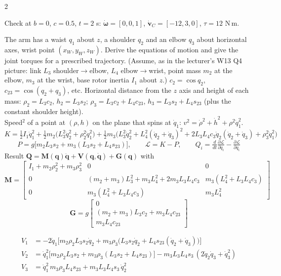 \begin{multicols}{2}
\begin{examq}
Check at $b=0$, $c=0.5$, $t=2$ s: $\dot{\boldsymbol\omega}=[0,0,1]$, $\dot{\mathbf v}_C=[-12,3,0]$, $\tau=12$ N\,m. \chk
\end{examq}
\begin{examq}
The arm has a waist $q_1$ about $z$, a shoulder $q_2$ and an elbow $q_3$ about horizontal axes, wrist point $(x_W,y_W,z_W)$. Derive the equations of motion and give the joint torques for a prescribed trajectory. (Assume, as in the lecturer's W13 Q4 picture: link $L_3$ shoulder$\to$elbow, $L_4$ elbow$\to$wrist, point mass $m_2$ at the elbow, $m_3$ at the wrist, base rotor inertia $I_1$ about $z$.)
\solution
$c_2=\cos q_2$, $c_{23}=\cos(q_2+q_3)$, etc. Horizontal distance from the $z$ axis and height of each mass:
$\rho_2=L_3c_2$, $h_2=L_3s_2$; $\rho_3=L_3c_2+L_4c_{23}$, $h_3=L_3s_2+L_4s_{23}$ (plus the constant shoulder height).\\
Speed$^2$ of a point at $(\rho,h)$ on the plane that spins at $\dot q_1$: $v^2=\dot\rho^2+\dot h^2+\rho^2\dot q_1^2$.
\[K=\tfrac12I_1\dot q_1^2+\tfrac12m_2\big(L_3^2\dot q_2^2+\rho_2^2\dot q_1^2\big)+\tfrac12m_3\big(L_3^2\dot q_2^2+L_4^2(\dot q_2{+}\dot q_3)^2+2L_3L_4c_3\dot q_2(\dot q_2{+}\dot q_3)+\rho_3^2\dot q_1^2\big)\]
\[P=g\big[m_2L_3s_2+m_3(L_3s_2+L_4s_{23})\big],\qquad \mathcal L=K-P,\qquad Q_i=\tfrac d{dt}\tfrac{\partial\mathcal L}{\partial\dot q_i}-\tfrac{\partial\mathcal L}{\partial q_i}\]
Result $\mathbf Q=\mathbf M(\mathbf q)\ddot{\mathbf q}+\mathbf V(\mathbf q,\dot{\mathbf q})+\mathbf G(\mathbf q)$ with
\[\mathbf M=\begin{bmatrix}I_1+m_2\rho_2^2+m_3\rho_3^2&0&0\\0&(m_2{+}m_3)L_3^2+m_3L_4^2+2m_3L_3L_4c_3&m_3(L_4^2+L_3L_4c_3)\\0&m_3(L_4^2+L_3L_4c_3)&m_3L_4^2\end{bmatrix}\]
\[\mathbf G=g\begin{bmatrix}0\\(m_2{+}m_3)L_3c_2+m_3L_4c_{23}\\m_3L_4c_{23}\end{bmatrix}\]
\end{examq}
\begin{examq}
\[\begin{aligned}V_1&=-2\dot q_1\big[m_2\rho_2L_3s_2\dot q_2+m_3\rho_3\big(L_3s_2\dot q_2+L_4s_{23}(\dot q_2{+}\dot q_3)\big)\big]\\ V_2&=\dot q_1^2\big[m_2\rho_2L_3s_2+m_3\rho_3(L_3s_2+L_4s_{23})\big]-m_3L_3L_4s_3\,(2\dot q_2\dot q_3+\dot q_3^2)\\ V_3&=\dot q_1^2\,m_3\rho_3L_4s_{23}+m_3L_3L_4s_3\,\dot q_2^2\end{aligned}\]

\end{examq}
\end{multicols}
